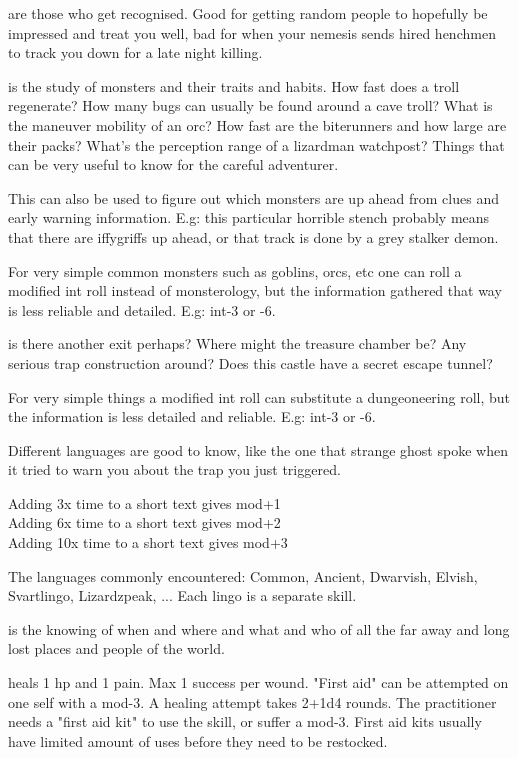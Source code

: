  are those who get recognised. Good for getting random people to hopefully be impressed and treat you well, bad for when your nemesis sends hired henchmen to track you down for a late night killing.


 is the study of monsters and their traits and habits. How fast does a troll regenerate? How many bugs can usually be found around a cave troll? What is the maneuver mobility of an orc? How fast are the biterunners and how large are their packs? What's the perception range of a lizardman watchpost? Things that can be very useful to know for the careful adventurer.

This can also be used to figure out which monsters are up ahead from clues and early warning information. E.g: this particular horrible stench probably means that there are iffygriffs up ahead, or that track is done by a grey stalker demon.

For very simple common monsters such as goblins, orcs, etc one can roll a modified int roll instead of monsterology, but the information gathered that way is less reliable and detailed. E.g: int-3 or -6.


 is there another exit perhaps? Where might the treasure chamber be? Any serious trap construction around? Does this castle have a secret escape tunnel?

For very simple things a modified int roll can substitute a dungeoneering roll, but the information is less detailed and reliable. E.g: int-3 or -6.


 Different languages are good to know, like the one that strange ghost spoke when it tried to warn you about the trap you just triggered.

Adding 3x time to a short text gives mod+1 \\
Adding 6x time to a short text gives mod+2 \\
Adding 10x time to a short text gives mod+3

The languages commonly encountered: Common, Ancient, Dwarvish, Elvish, Svartlingo, Lizardzpeak, ...  Each lingo is a separate skill.


 is the knowing of when and where and what and who of all the far away and long lost places and people of the world.


 heals 1 hp and 1 pain. Max 1 success per wound. "First aid" can be attempted on one self with a mod-3. A healing attempt takes 2+1d4 rounds. The practitioner needs a "first aid kit" to use the skill, or suffer a mod-3. First aid kits usually have limited amount of uses before they need to be restocked.

